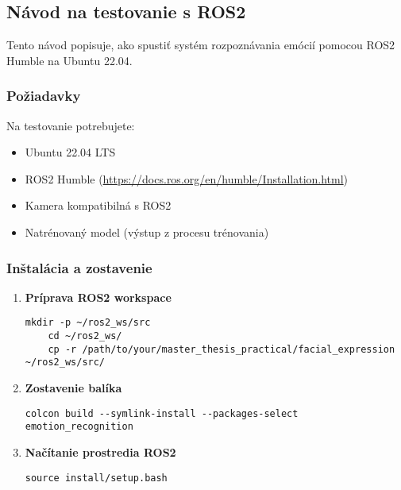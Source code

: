 \subsection{Návod na testovanie s ROS2}

Tento návod popisuje, ako spustiť systém rozpoznávania emócií pomocou ROS2 Humble na Ubuntu 22.04.

\subsubsection{Požiadavky}
Na testovanie potrebujete:
\begin{itemize}
    \item Ubuntu 22.04 LTS
    \item ROS2 Humble (\url{https://docs.ros.org/en/humble/Installation.html})
    \item Kamera kompatibilná s ROS2
    \item Natrénovaný model (výstup z procesu trénovania)
\end{itemize}

\subsubsection{Inštalácia a zostavenie}
\begin{enumerate}
    \item \textbf{Príprava ROS2 workspace}
    \begin{lstlisting}[basicstyle=\ttfamily\small]
    mkdir -p ~/ros2_ws/src
    cd ~/ros2_ws/
    cp -r /path/to/your/master_thesis_practical/facial_expression ~/ros2_ws/src/
    \end{lstlisting}
    
    \item \textbf{Zostavenie balíka}
    \begin{lstlisting}[basicstyle=\ttfamily\small]
    colcon build --symlink-install --packages-select emotion_recognition
    \end{lstlisting}
    
    \item \textbf{Načítanie prostredia ROS2}
    \begin{lstlisting}[basicstyle=\ttfamily\small]
    source install/setup.bash
    \end{lstlisting}
\end{enumerate}

